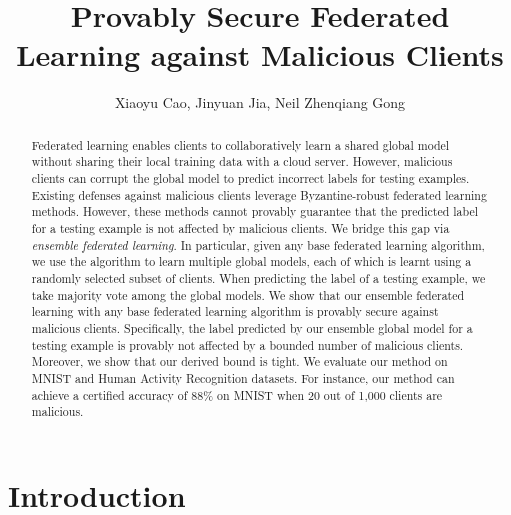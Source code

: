 \documentclass[letterpaper]{article} %
\title{Provably Secure Federated Learning against Malicious Clients}
\author{
       Xiaoyu Cao,
       Jinyuan Jia, 
       Neil Zhenqiang Gong \\
}
\begin{document}

\maketitle



\begin{abstract}
Federated learning enables clients to collaboratively learn a shared global model without sharing their local training data with a cloud server. However, malicious clients can corrupt the global model to predict incorrect labels for testing examples. Existing defenses against malicious clients leverage Byzantine-robust federated learning methods. However, these methods cannot provably guarantee that the predicted label for a testing example is  not affected by malicious clients.  We bridge this gap via \emph{ensemble federated learning}.  In particular, given any base federated learning algorithm, we use the algorithm to learn multiple global models, each of which is learnt using a randomly selected subset of clients. When predicting the label of a testing example, we take majority vote among the  global models. We show that our ensemble federated learning with any base federated learning algorithm is provably secure against malicious clients. Specifically, the label predicted by our ensemble global model for a testing example is provably not affected by a bounded number of malicious clients. Moreover, we show that our derived bound is tight. We evaluate our method on MNIST and Human Activity Recognition datasets. For instance, our method can achieve a certified accuracy of 88\% on MNIST when 20 out of 1,000 clients are malicious.
\end{abstract}


\section{Introduction}
\end{document}

